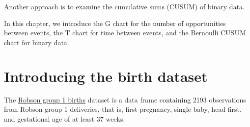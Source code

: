 \documentclass[
]{book}
\newenvironment{Shaded}{\begin{snugshade}}{\end{snugshade}}
\newcommand{\AttributeTok}[1]{\textcolor[rgb]{0.13,0.29,0.53}{#1}}
\newcommand{\CommentTok}[1]{\textcolor[rgb]{0.56,0.35,0.01}{\textit{#1}}}
\newcommand{\DecValTok}[1]{\textcolor[rgb]{0.00,0.00,0.81}{#1}}
\newcommand{\FunctionTok}[1]{\textcolor[rgb]{0.13,0.29,0.53}{\textbf{#1}}}
\newcommand{\NormalTok}[1]{#1}
\newcommand{\OtherTok}[1]{\textcolor[rgb]{0.56,0.35,0.01}{#1}}
\newcommand{\SpecialCharTok}[1]{\textcolor[rgb]{0.81,0.36,0.00}{\textbf{#1}}}
\newcommand{\StringTok}[1]{\textcolor[rgb]{0.31,0.60,0.02}{#1}}
\begin{document}
Another approach is to examine the cumulative sums (CUSUM) of binary data.

In this chapter, we introduce the G chart for the number of opportunities between events, the T chart for time between events, and the Bernoulli CUSUM chart for binary data.

\section{Introducing the birth dataset}\label{introducing-the-birth-dataset}

The \hyperref[robson-group-1-births]{Robson group 1 births} dataset is a data frame containing 2193 observations from Robson group 1 deliveries, that is, first pregnancy, single baby, head first, and gestational age of at least 37 weeks.

\begin{Shaded}
\end{Shaded}
\end{document}
